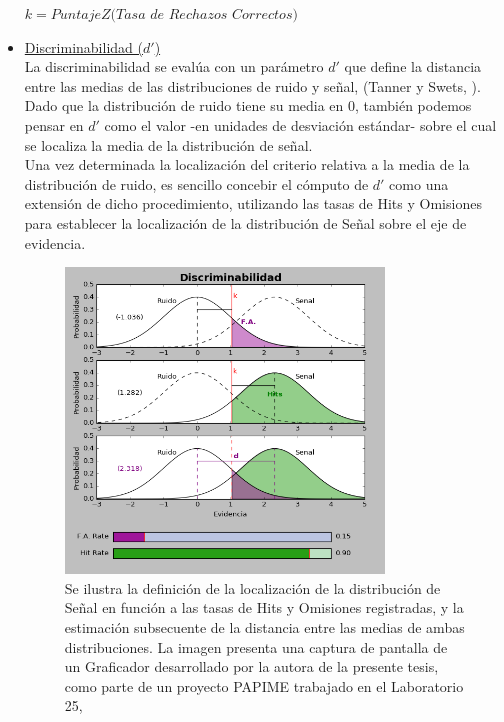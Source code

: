 \begin{itemize}
\begin{center}
$k = PuntajeZ(Tasa$ $de$ $Rechazos$ $Correctos)$\\
\end{center}

\item \underline{Discriminabilidad ($d'$)}\\

La discriminabilidad se evalúa con un parámetro $d'$ que define la distancia entre las medias de las distribuciones de ruido y señal, (Tanner y Swets, \citeyear{Tanner1954}). Dado que la distribución de ruido tiene su media en 0, también podemos pensar en $d'$ como el valor -en unidades de desviación estándar- sobre el cual se localiza la media de la distribución de señal.\\ 

Una vez determinada la localización del criterio relativa a la media de la distribución de ruido, es sencillo concebir el cómputo de $d'$ como una extensión de dicho procedimiento, utilizando las tasas de Hits y Omisiones para establecer la localización de la distribución de Señal sobre el eje de evidencia.\\ 

\begin{figure}[th]
\centering
\includegraphics[width=0.80\textwidth]{Figures/Graficador_Discriminabilidad} 
\caption[Estimación de la discriminabilidad con base en las Tasas de Ejecución]{Se ilustra la definición de la localización de la distribución de Señal en función a las tasas de Hits y Omisiones registradas, y la estimación subsecuente de la distancia entre las medias de ambas distribuciones. La imagen presenta una captura de pantalla de un Graficador desarrollado por la autora de la presente tesis, como parte de un proyecto PAPIME trabajado en el Laboratorio 25, \citep{PAPIME}}
\label{fig:Graf_Discrim}
\end{figure}


\end{itemize}
